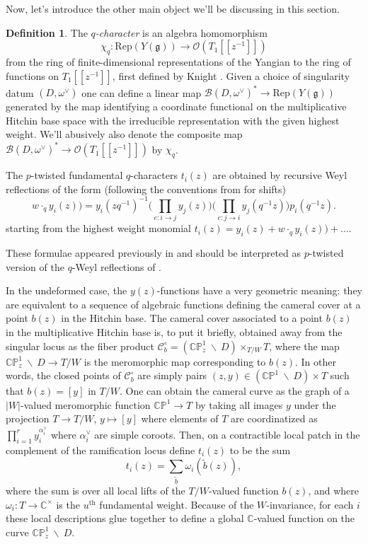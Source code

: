 \documentclass[11pt, oneside, reqno]{amsart}
\theoremstyle{definition} \newtheorem{definition}{Definition}[section]
\theoremstyle{definition} \newtheorem{remark}[definition]{Remark}
\theoremstyle{definition} \newtheorem{remarks}[definition]{Remarks}
\theoremstyle{definition} \newtheorem{question}[definition]{Question}
\theoremstyle{definition} \newtheorem*{note}{Note}
\theoremstyle{definition} \newtheorem{example}[definition]{Example}
\theoremstyle{definition} \newtheorem{examples}[definition]{Examples}
\renewcommand{\gg}{\mathfrak{g}}
\newcommand{\bb}[1]{\mathbb{#1}}
\newcommand{\mr}[1]{\mathrm{#1}}
\newcommand{\mc}[1]{\mathcal{#1}}
\newcommand{\wt}[1]{\widetilde{#1}}
\newcommand{\bs}{\ \backslash \ }
\newcommand{\OO}{\mathcal{O}}
\begin{document}
Now, let's introduce the other main object we'll be discussing in this section.
 
\begin{definition}
The \emph{$q$-character} is an algebra homomorphism 
\[\chi_q \colon \mr{Rep}(Y(\gg)) \to \OO(T_1[[z^{-1}]])\]
from the ring of finite-dimensional representations of the Yangian to the ring of functions on $T_1[[z^{-1}]]$, first defined by Knight \cite{Knight}.  Given a choice of singularity datum $(D,\omega^\vee)$ one can define a linear map $\mc B(D, \omega^\vee)^* \to \mr{Rep}(Y(\gg))$ generated by the map identifying a coordinate functional on the multiplicative Hitchin base space with the irreducible representation with the given highest weight.  We'll abusively also denote the composite map $\mc B(D, \omega^\vee)^* \to \OO(T_1[[z^{-1}]])$ by $\chi_q$.
\end{definition}

The  $p$-twisted fundamental $q$-characters $t_i(z)$ are obtained by recursive Weyl reflections of the form \cite{NekrasovPestun,NekrasovPestunShatashvili,Nekrasov:2015wsu} (following the conventions from \cite{Kimura:2015rgi} for shifts)
\begin{equation}
  w \cdot_q y_i(z)) = y_{i}(z q^{-1})^{-1} \Bigg(\prod_{e: i \to j} y_j(z) \Bigg) \Bigg(\prod_{e: j\to i} y_j(q^{-1} z)\Bigg)  p_{i}( q^{-1} z).
  \label{iWeyl_action}
\end{equation}
starting from the highest weight monomial $t_i(z) = y_i(z) +  w \cdot_q y_i(z)) + \dots $. 

These formulae appeared previously in \cite{NekrasovPestun, NekrasovPestunShatashvili} and
should be interpreted as $p$-twisted version of the $q$-Weyl reflections of \cite{FrenkelReshetikhin2,FrenkelReshetikhinSTS,FrenkelReshetikhin1,Frenkel2001}.

In the undeformed case, the $y(z)$-functions have a very geometric meaning: they are equivalent to a sequence of algebraic functions defining the cameral cover at a point $b(z)$ in the Hitchin base.  The cameral cover associated to a point $b(z)$ in the multiplicative Hitchin base is, to put it briefly, obtained away from the singular locus as the fiber product $\mc C_b^\circ = (\bb{CP}^1_z \bs D) \times_{T/W} T$, where the map $\bb{CP}^1_z \bs D \to T/W$ is the meromorphic map corresponding to $b(z)$.  In other words, the closed points of $\mc C^\circ_b$ are simply pairs $(z, y) \in (\bb{CP}^1 \bs D) \times T$ such that $b(z) = [y]$ in $T/W$.  One can obtain the cameral curve as the graph of a $|W|$-valued
meromorphic function $\bb{CP}^1 \to T$ by
taking all images $y$ under the projection $T \to T/W$, $y \mapsto [y]$ where elements of $T$ are
coordinatized as  $\prod_{i = 1}^{r} y_i^{\alpha_i^{\vee}}$ where $\alpha_i^{\vee}$ are simple coroots.
Then, on a contractible local patch in the complement of the ramification locus define $t_i(z)$ to be the sum 
\[t_i(z) = \sum_{\wt b} \omega_i(\wt b(z)),\]
where the sum is over all local lifts of the $T/W$-valued function $b(z)$, and where $\omega_i \colon T \to \mathbb{C}^{\times}$ is the $u^\text{th}$ fundamental weight. Because of the $W$-invariance, for each $i$ these local descriptions glue together to define a global $\mathbb{C}$-valued function on the curve $\bb{CP}^1_z \bs D$.
\end{document}
